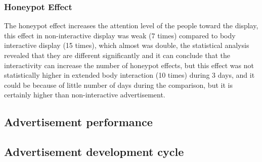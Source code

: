 \subsubsection{Honeypot Effect}
The honeypot effect increases the attention level of the people toward the display, this effect in non-interactive display was weak (7 times) compared to body interactive display (15 times), which almost was double, the statistical analysis revealed that they are different significantly and it can conclude that the interactivity can increase the number of honeypot effects, but this effect was not statistically higher in extended body interaction (10 times) during 3 days, and it could be because of little number of days during the comparison, but it is certainly higher than non-interactive advertisement. 

\subsection{Advertisement performance}


\subsection{Advertisement development cycle}





